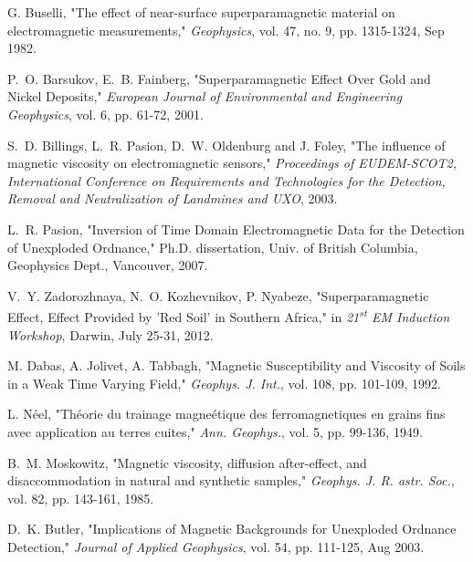 \documentclass[journal]{IEEEtran}  %
\begin{document}
\begin{thebibliography}{100}

G. Buselli, "The effect of near-surface superparamagnetic material on electromagnetic measurements," \emph{Geophysics}, vol. 47, no. 9, pp. 1315-1324, Sep 1982.

P.~O. Barsukov, E.~B. Fainberg, "Superparamagnetic Effect Over Gold and Nickel Deposits," \emph{European Journal of Environmental and Engineering Geophysics}, vol. 6, pp. 61-72, 2001.

S.~D. Billings, L.~R. Pasion, D.~W. Oldenburg and J. Foley, "The influence of magnetic viscosity on electromagnetic sensors," \emph{Proceedings of EUDEM-SCOT2, International Conference on Requirements and Technologies for the Detection, Removal and Neutralization of Landmines and UXO}, 2003.

L.~R. Pasion, "Inversion of Time Domain Electromagnetic Data for the Detection of Unexploded Ordnance," Ph.D. dissertation, Univ. of British Columbia, Geophysics Dept., Vancouver, 2007.

V.~Y. Zadorozhnaya, N.~O. Kozhevnikov, P. Nyabeze, "Superparamagnetic Effect, Effect Provided by 'Red Soil' in Southern Africa," in \emph{21\textsuperscript{st} EM Induction Workshop}, Darwin, July 25-31, 2012.

M. Dabas, A. Jolivet, A. Tabbagh, "Magnetic Susceptibility and Viscosity of Soils in a Weak Time Varying Field," \emph{Geophys. J. Int.}, vol. 108, pp. 101-109, 1992.

L. N\'{e}el, "Th\'{e}orie du trainage magne\'{e}tique des ferromagnetiques en grains fins avec application au terres cuites," \emph{Ann. Geophys.}, vol. 5, pp. 99-136, 1949.

B.~M. Moskowitz, "Magnetic viscosity, diffusion after-effect, and disaccommodation in natural and synthetic samples," \emph{Geophys. J. R. astr. Soc.}, vol. 82, pp. 143-161, 1985.

D.~K. Butler, "Implications of Magnetic Backgrounds for Unexploded Ordnance Detection," \emph{Journal of Applied Geophysics}, vol. 54, pp. 111-125, Aug 2003.



\end{thebibliography}
\end{document}
